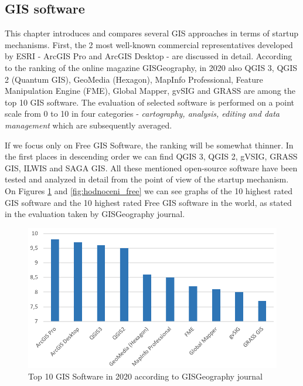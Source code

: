 \documentclass[a4paper,10pt,twoside]{article}
\begin{document}
\subsection{GIS software}

This chapter introduces and compares several GIS approaches in terms of startup mechanisms. First, the 2 most well-known commercial representatives developed by ESRI - ArcGIS Pro and ArcGIS Desktop - are discussed in detail. According to the ranking of the online magazine GISGeography, in 2020 also QGIS 3, QGIS 2 (Quantum GIS), GeoMedia (Hexagon), MapInfo Professional, Feature Manipulation Engine (FME), Global Mapper, gvSIG and GRASS are among the top 10 GIS software. The evaluation of selected software is performed on a point scale from 0 to 10 in four categories - \textit{cartography, analysis, editing and data management} which are subsequently averaged. 

If we focus only on Free GIS Software, the ranking will be somewhat thinner. In the first places in descending order we can find QGIS 3, QGIS 2, gVSIG, GRASS GIS, ILWIS and SAGA GIS. All these mentioned open-source software have been tested and analyzed in detail from the point of view of the startup mechanism. On Figures \ref{fig:hodnoceni_all} and  \ref{fig:hodnoceni_free} we can see graphs of the 10 highest rated GIS software and the 10 highest rated Free GIS software in the world, as stated in the evaluation taken by GISGeography journal.

\vspace{0.3cm}
\begin{figure}[hbt!] 
\begin{center}
\includegraphics[width=13cm]{../pictures/hodnoceni_all.png} 
\caption[Top 10 GIS Software in 2020 according to GISGeography journal]{Top 10 GIS Software in 2020 according to GISGeography journal}
\label{fig:hodnoceni_all}
\end{center}
\end{figure}
\end{document}
